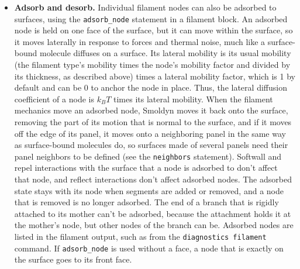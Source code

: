 \documentclass {scrbook}
\newcommand {\ttt} {\texttt}
\begin{document}
\begin{itemize}
\item \textbf{Adsorb and desorb.} Individual filament nodes can also be adsorbed to surfaces, using the \ttt{adsorb\_node} statement in a filament block. An adsorbed node is held on one face of the surface, but it can move within the surface, so it moves laterally in response to forces and thermal noise, much like a surface-bound molecule diffuses on a surface. Its lateral mobility is its usual mobility (the filament type's mobility times the node's mobility factor and divided by its thickness, as described above) times a lateral mobility factor, which is 1 by default and can be 0 to anchor the node in place. Thus, the lateral diffusion coefficient of a node is $k_BT$ times its lateral mobility. When the filament mechanics move an adsorbed node, Smoldyn moves it back onto the surface, removing the part of its motion that is normal to the surface, and if it moves off the edge of its panel, it moves onto a neighboring panel in the same way as surface-bound molecules do, so surfaces made of several panels need their panel neighbors to be defined (see the \ttt{neighbors} statement). Softwall and repel interactions with the surface that a node is adsorbed to don't affect that node, and reflect interactions don't affect adsorbed nodes. The adsorbed state stays with its node when segments are added or removed, and a node that is removed is no longer adsorbed. The end of a branch that is rigidly attached to its mother can't be adsorbed, because the attachment holds it at the mother's node, but other nodes of the branch can be. Adsorbed nodes are listed in the filament output, such as from the \ttt{diagnostics filament} command. If \ttt{adsorb\_node} is used without a face, a node that is exactly on the surface goes to its front face.


\end{itemize}
\end{document}

